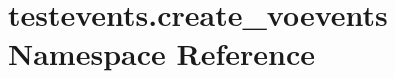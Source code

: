 \hypertarget{namespacetestevents_1_1create__voevents}{\section{testevents.\-create\-\_\-voevents Namespace Reference}
\label{namespacetestevents_1_1create__voevents}
}
